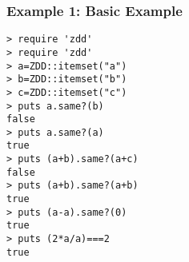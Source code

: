\subsubsection*{Example 1: Basic Example}



\begin{Verbatim}[baselinestretch=0.7,frame=single]
> require 'zdd'
> require 'zdd'
> a=ZDD::itemset("a")
> b=ZDD::itemset("b")
> c=ZDD::itemset("c")
> puts a.same?(b)
false
> puts a.same?(a)
true
> puts (a+b).same?(a+c)
false
> puts (a+b).same?(a+b)
true
> puts (a-a).same?(0)
true
> puts (2*a/a)===2
true
\end{Verbatim}

